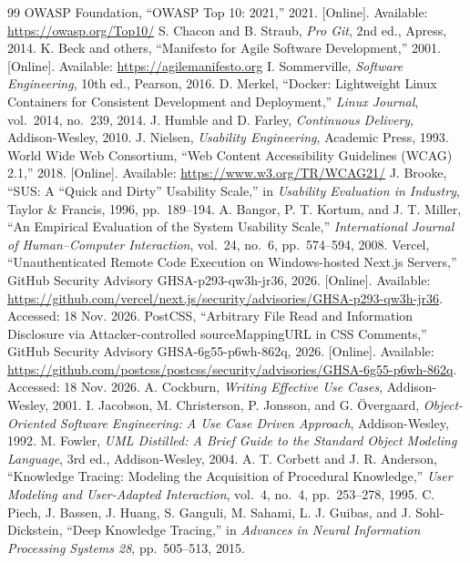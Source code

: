 \begin{thebibliography}{99}
 OWASP Foundation, ``{OWASP} Top 10: 2021,'' 2021. [Online]. Available: \url{https://owasp.org/Top10/}
 S. Chacon and B. Straub, \textit{Pro Git}, 2nd ed., Apress, 2014.
 K. Beck and others, ``Manifesto for Agile Software Development,'' 2001. [Online]. Available: \url{https://agilemanifesto.org}
 I. Sommerville, \textit{Software Engineering}, 10th ed., Pearson, 2016.
 D. Merkel, ``Docker: Lightweight {Linux} Containers for Consistent Development and Deployment,'' \textit{Linux Journal}, vol.~2014, no.~239, 2014.
 J. Humble and D. Farley, \textit{Continuous Delivery}, Addison-Wesley, 2010.
 J. Nielsen, \textit{Usability Engineering}, Academic Press, 1993.
 World Wide Web Consortium, ``Web Content Accessibility Guidelines ({WCAG}) 2.1,'' 2018. [Online]. Available: \url{https://www.w3.org/TR/WCAG21/}
 J. Brooke, ``{SUS}: A ``Quick and Dirty'' Usability Scale,'' in \textit{Usability Evaluation in Industry}, Taylor \& Francis, 1996, pp.~189--194.
 A. Bangor, P. T. Kortum, and J. T. Miller, ``An Empirical Evaluation of the System Usability Scale,'' \textit{International Journal of Human--Computer Interaction}, vol.~24, no.~6, pp.~574--594, 2008.
 Vercel, ``Unauthenticated Remote Code Execution on Windows-hosted Next.js Servers,'' GitHub Security Advisory GHSA-p293-qw3h-jr36, 2026. [Online]. Available: \url{https://github.com/vercel/next.js/security/advisories/GHSA-p293-qw3h-jr36}. Accessed: 18 Nov. 2026.
 PostCSS, ``Arbitrary File Read and Information Disclosure via Attacker-controlled sourceMappingURL in CSS Comments,'' GitHub Security Advisory GHSA-6g55-p6wh-862q, 2026. [Online]. Available: \url{https://github.com/postcss/postcss/security/advisories/GHSA-6g55-p6wh-862q}. Accessed: 18 Nov. 2026.
 A. Cockburn, \textit{Writing Effective Use Cases}, Addison-Wesley, 2001.
 I. Jacobson, M. Christerson, P. Jonsson, and G. {\"O}vergaard, \textit{Object-Oriented Software Engineering: A Use Case Driven Approach}, Addison-Wesley, 1992.
 M. Fowler, \textit{{UML} Distilled: A Brief Guide to the Standard Object Modeling Language}, 3rd ed., Addison-Wesley, 2004.
 A. T. Corbett and J. R. Anderson, ``Knowledge Tracing: Modeling the Acquisition of Procedural Knowledge,'' \textit{User Modeling and User-Adapted Interaction}, vol.~4, no.~4, pp.~253--278, 1995.
 C. Piech, J. Bassen, J. Huang, S. Ganguli, M. Sahami, L. J. Guibas, and J. Sohl-Dickstein, ``Deep Knowledge Tracing,'' in \textit{Advances in Neural Information Processing Systems 28}, pp.~505--513, 2015.
\end{thebibliography}
\clearpage
